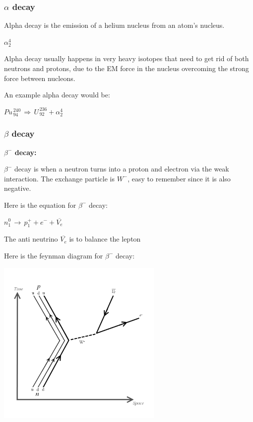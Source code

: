 \documentclass[a4paper, 12pt]{article}
\begin{document}
\subsubsection{{$\alpha$} decay}

Alpha decay is the emission of a helium nucleus from an atom's nucleus.

${\alpha^4_2}$

Alpha decay usually happens in very heavy isotopes that need to get rid of both neutrons and protons, due to the EM force in the nucleus overcoming the strong force between nucleons.

An example alpha decay would be:

$Pu^{\,240}_{\,94}\, {\Rightarrow}\, U^{\,236}_{\,92} + \alpha^4_2$

\subsubsection{{$\beta$} decay}

\textbf{$\beta^-$ decay:}

$\beta^-$ decay is when a neutron turns into a proton and electron via the weak interaction. The exchange particle is $W^-$, easy to remember since it is also negative.

Here is the equation for $\beta^-$ decay:

$n^0_1 \, \rightarrow \, p^+_1 + e^- + \overline{V_e}$

The anti neutrino $\overline{V_e}$ is to balance the lepton 

Here is the feynman diagram for $\beta^-$ decay:

\begin{center}
\includegraphics[height=8cm]{betaMinus.png}
\end{center}
\end{document}

